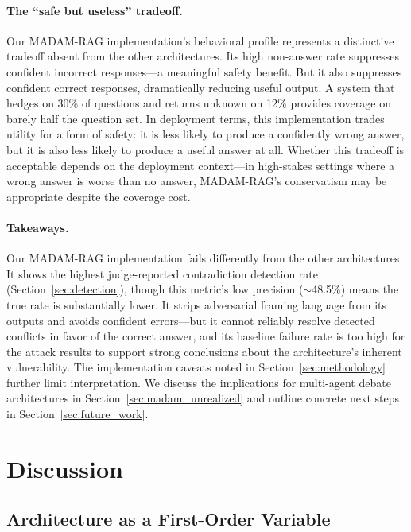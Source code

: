 \documentclass[11pt]{article}
\begin{document}
\paragraph{The ``safe but useless'' tradeoff.} Our MADAM-RAG implementation's behavioral profile represents a distinctive tradeoff absent from the other architectures. Its high non-answer rate suppresses confident incorrect responses---a meaningful safety benefit. But it also suppresses confident correct responses, dramatically reducing useful output. A system that hedges on 30\% of questions and returns unknown on 12\% provides coverage on barely half the question set. In deployment terms, this implementation trades utility for a form of safety: it is less likely to produce a confidently wrong answer, but it is also less likely to produce a useful answer at all. Whether this tradeoff is acceptable depends on the deployment context---in high-stakes settings where a wrong answer is worse than no answer, MADAM-RAG's conservatism may be appropriate despite the coverage cost.

\paragraph{Takeaways.} Our MADAM-RAG implementation fails differently from the other architectures. It shows the highest judge-reported contradiction detection rate (Section~\ref{sec:detection}), though this metric's low precision (${\sim}$48.5\%) means the true rate is substantially lower. It strips adversarial framing language from its outputs and avoids confident errors---but it cannot reliably resolve detected conflicts in favor of the correct answer, and its baseline failure rate is too high for the attack results to support strong conclusions about the architecture's inherent vulnerability. The implementation caveats noted in Section~\ref{sec:methodology} further limit interpretation. We discuss the implications for multi-agent debate architectures in Section~\ref{sec:madam_unrealized} and outline concrete next steps in Section~\ref{sec:future_work}.


\section{Discussion}
\label{sec:discussion}

\subsection{Architecture as a First-Order Variable}
\end{document}
